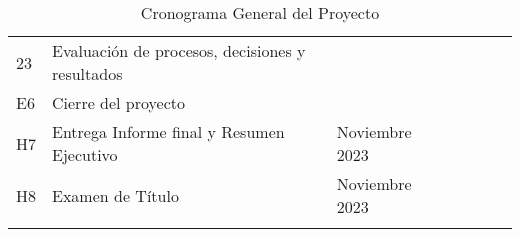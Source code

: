 \begin{longtable}[c]{@{}llllllll@{}}
	23                                     & Evaluación de procesos, decisiones y resultados &                                       &                                          &               &                &                  &                 \\
	E6                                     & Cierre del proyecto                             &                                       &                                          &               &                &                  &                 \\
	H7                                     & Entrega Informe final y Resumen Ejecutivo       & \multicolumn{2}{l}{Noviembre 2023}    &                                          &               &                &                                    \\
	H8                                     & Examen de Título                                & \multicolumn{2}{l}{Noviembre 2023}    &                                          &               &                &                                    \\* \bottomrule
	\caption{Cronograma General del Proyecto}
	\label{tab:cronograma}                                                                                                                                                                                                                            \\
\end{longtable}
